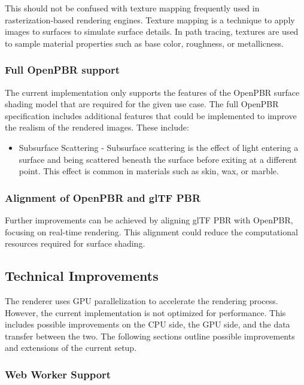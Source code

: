 This should not be confused with texture mapping frequently used in rasterization-based rendering engines. Texture mapping is a technique to apply images to surfaces to simulate surface details. In path tracing, textures are used to sample material properties such as base color, roughness, or metallicness.

\subsubsection*{Full OpenPBR support}

The current implementation only supports the features of the \gls{OpenPBR} surface shading model that are required for the given use case. The full \gls{OpenPBR} specification includes additional features that could be implemented to improve the realism of the rendered images. These include:

\begin{itemize}
    \item{Subsurface Scattering} - Subsurface scattering is the effect of light entering a surface and being scattered beneath the surface before exiting at a different point. This effect is common in materials such as skin, wax, or marble.
\end{itemize}


\subsubsection*{Alignment of OpenPBR and glTF PBR}

Further improvements can be achieved by aligning \gls{glTF} \gls{PBR} with \gls{OpenPBR}, focusing on real-time rendering. This alignment could reduce the computational resources required for surface shading.

\subsection*{Technical Improvements}

The renderer uses \gls{GPU} parallelization to accelerate the rendering process. However, the current implementation is not optimized for performance. This includes possible improvements on the \gls{CPU} side, the \gls{GPU} side, and the data transfer between the two. The following sections outline possible improvements and extensions of the current setup.

\subsubsection*{Web Worker Support}

